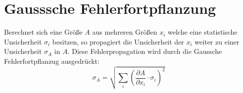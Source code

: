 \documentclass{include/thesisclass3}
\newcommand{\cc}{\cdot}
\newcommand{\p}{\partial}
\begin{document}
\section{Gausssche Fehlerfortpflanzung}
Berechnet sich eine Größe $A$ aus mehreren Größen $x_i$ welche eine statistische Unsicherheit $\sigma_i$ besitzen, so propagiert die Unsicherheit der $x_i$ weiter zu einer Unsicherheit $\sigma_A$ in $A$. Diese Fehlerpropagation wird durch die Gaussche Fehlerfortpflanzug ausgedrückt:
\begin{equation}
\sigma_A = \sqrt{\sum_i \left( \frac{\p A}{\p x_i} \cc \sigma_i \right)^2 }
\label{gauss}
\end{equation}
\end{document}
